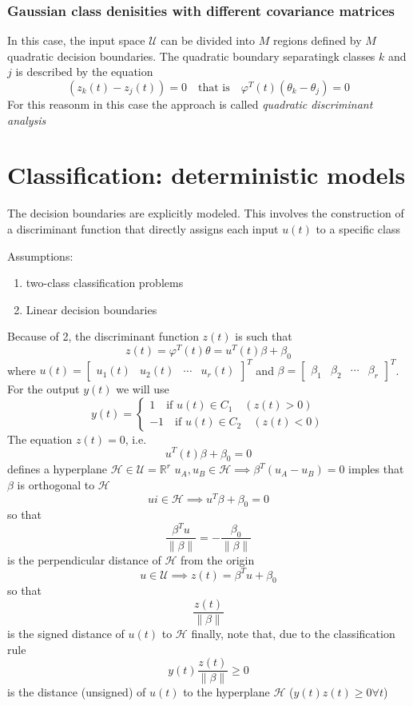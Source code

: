 \documentclass{book}
\begin{document}
\subsection{Gaussian class denisities with different covariance matrices}
In this case, the input space $\mathcal{U}$ can be divided into $M$ regions defined by $M$ quadratic decision boundaries. The quadratic boundary separatingk classes $k$ and $j$ is described by the equation 
\[
    (z_k(t)-z_j(t))=0 \quad \text{that is} \quad \varphi^T(t)(\theta_k-\theta_j)=0
\]
For this reasonm in this case the approach is called \emph{quadratic discriminant analysis}

\chapter{Classification: deterministic models}
The decision boundaries are explicitly modeled. This involves the construction of a discriminant function that directly assigns each input $u(t)$ to a specific class 

Assumptions:
\begin{enumerate}
    \item two-class classification problems
    \item Linear decision boundaries 
\end{enumerate}
Because of 2, the discriminant function $z(t)$ is such that 
\[
    z(t)=\varphi^T(t)\theta=u^T(t)\beta+\beta_0
\]
where $u(t) =\begin{bmatrix}
    u_1(t) & u_2(t) & \cdots & u_r(t)
\end{bmatrix}^T$ and $\beta = \begin{bmatrix}
    \beta_1 & \beta_2 & \cdots & \beta_r
\end{bmatrix}^T$.
For the output $y(t)$ we will use 
\[
    y(t) = \begin{cases}
        1 \quad \text{if } u(t)\in C_1 \quad (z(t)>0)\\
        -1 \quad \text{if } u(t)\in C_2 \quad (z(t)<0)
    \end{cases}
\]
The equation $z(t)=0$, i.e. 
\[
    u^T(t)\beta+\beta_0=0
\]
defines a hyperplane $\mathcal{H}\in\mathcal{U}=\mathbb{R}^r$
$u_A,u_B \in \mathcal{H} \implies \beta^T(u_A-u_B)=0$ imples that $\beta$ is orthogonal to $\mathcal{H}$ 
\[
    ui\in\mathcal{H}\implies u^T\beta+\beta_0=0
\]
so that  
\[
    \displaystyle\frac{\beta^Tu}{\|\beta\|}=-\displaystyle\frac{\beta_0}{\|\beta\|}
\]
is the perpendicular distance of $\mathcal{H}$ from the origin 
\[
    u\in\mathcal{U}\implies z(t) =\beta^Tu+\beta_0
\]
so that 
\[
    \displaystyle\frac{z(t)}{\|\beta\|}
\]
is the signed distance of $u(t)$ to $\mathcal{H}$
finally, note that, due to the classification rule 
\[
    y(t)\displaystyle\frac{z(t)}{\|\beta\|}\geq 0
\]
is the distance (unsigned) of $u(t)$ to the hyperplane $\mathcal{H}$ ($y(t)z(t)\geq 0 \forall t$)
\end{document}
